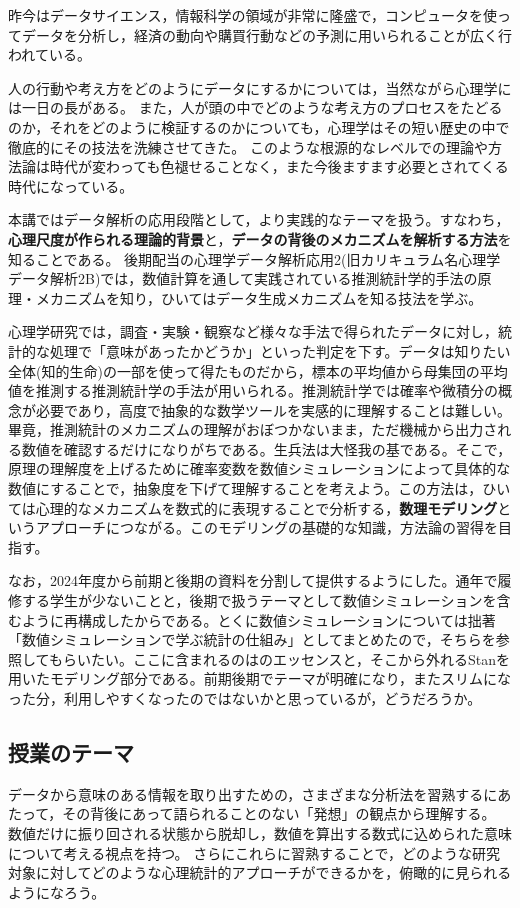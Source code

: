 昨今はデータサイエンス，情報科学の領域が非常に隆盛で，コンピュータを使ってデータを分析し，経済の動向や購買行動などの予測に用いられることが広く行われている。

人の行動や考え方をどのようにデータにするかについては，当然ながら心理学には一日の長がある。
また，人が頭の中でどのような考え方のプロセスをたどるのか，それをどのように検証するのかについても，心理学はその短い歴史の中で徹底的にその技法を洗練させてきた。
このような根源的なレベルでの理論や方法論は時代が変わっても色褪せることなく，また今後ますます必要とされてくる時代になっている。

本講ではデータ解析の応用段階として，より実践的なテーマを扱う。すなわち，\textbf{心理尺度が作られる理論的背景}と，\textbf{データの背後のメカニズムを解析する方法}を知ることである。
後期配当の心理学データ解析応用2(旧カリキュラム名心理学データ解析2B)では，数値計算を通して実践されている推測統計学的手法の原理・メカニズムを知り，ひいてはデータ生成メカニズムを知る技法を学ぶ。

心理学研究では，調査・実験・観察など様々な手法で得られたデータに対し，統計的な処理で「意味があったかどうか」といった判定を下す。データは知りたい全体(知的生命)の一部を使って得たものだから，標本の平均値から母集団の平均値を推測する推測統計学の手法が用いられる。推測統計学では確率や微積分の概念が必要であり，高度で抽象的な数学ツールを実感的に理解することは難しい。畢竟，推測統計のメカニズムの理解がおぼつかないまま，ただ機械から出力される数値を確認するだけになりがちである。生兵法は大怪我の基である。そこで，原理の理解度を上げるために確率変数を数値シミュレーションによって具体的な数値にすることで，抽象度を下げて理解することを考えよう。この方法は，ひいては心理的なメカニズムを数式的に表現することで分析する，\textbf{数理モデリング}というアプローチにつながる。このモデリングの基礎的な知識，方法論の習得を目指す。

なお，2024年度から前期と後期の資料を分割して提供するようにした。通年で履修する学生が少ないことと，後期で扱うテーマとして数値シミュレーションを含むように再構成したからである。とくに数値シミュレーションについては拙著「数値シミュレーションで学ぶ統計の仕組み」\parencite{kosugi2023}としてまとめたので，そちらを参照してもらいたい。ここに含まれるのは\textcite{kosugi2023}のエッセンスと，そこから外れるStanを用いたモデリング部分である。前期後期でテーマが明確になり，またスリムになった分，利用しやすくなったのではないかと思っているが，どうだろうか。

\subsection*{授業のテーマ}
データから意味のある情報を取り出すための，さまざまな分析法を習熟するにあたって，その背後にあって語られることのない「発想」の観点から理解する。
数値だけに振り回される状態から脱却し，数値を算出する数式に込められた意味について考える視点を持つ。
さらにこれらに習熟することで，どのような研究対象に対してどのような心理統計的アプローチができるかを，俯瞰的に見られるようになろう。

